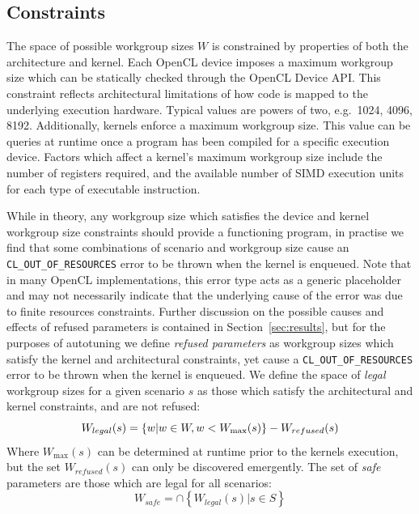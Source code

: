 \documentclass[preprint,nonatbib,10pt]{sigplanconf}
\begin{document}
\subsection{Constraints}

The space of possible workgroup sizes $W$ is constrained by properties
of both the architecture and kernel. Each OpenCL device imposes a
maximum workgroup size which can be statically checked through the
OpenCL Device API. This constraint reflects architectural limitations
of how code is mapped to the underlying execution hardware. Typical
values are powers of two, e.g.\ 1024, 4096, 8192. Additionally,
kernels enforce a maximum workgroup size. This value can be queries at
runtime once a program has been compiled for a specific execution
device. Factors which affect a kernel's maximum workgroup size include
the number of registers required, and the available number of SIMD
execution units for each type of executable instruction.

While in theory, any workgroup size which satisfies the device and
kernel workgroup size constraints should provide a functioning
program, in practise we find that some combinations of scenario and
workgroup size cause an \texttt{CL\_OUT\_OF\_RESOURCES} error to be
thrown when the kernel is enqueued. Note that in many OpenCL
implementations, this error type acts as a generic placeholder and may
not necessarily indicate that the underlying cause of the error was
due to finite resources constraints. Further discussion on the
possible causes and effects of refused parameters is contained in
Section~\ref{sec:results}, but for the purposes of autotuning we
define \emph{refused parameters} as workgroup sizes which satisfy the
kernel and architectural constraints, yet cause a
\texttt{CL\_OUT\_OF\_RESOURCES} error to be thrown when the kernel is
enqueued. We define the space of \emph{legal} workgroup sizes for a
given scenario $s$ as those which satisfy the architectural and kernel
constraints, and are not refused:
%
\begin{equation}
  \footnotesize
  W_{legal}(s) = \left\{w | w \in W, w < W_{\max}(s) \right\} - W_{refused}(s)
\end{equation}
%
Where $W_{\max}(s)$ can be determined at runtime prior to the kernels
execution, but the set $W_{refused}(s)$ can only be discovered
emergently. The set of \emph{safe} parameters are those which are
legal for all scenarios:
%
\begin{equation}
  W_{safe} = \cap \left\{ W_{legal}(s) | s \in S \right\}
\end{equation}
\end{document}
